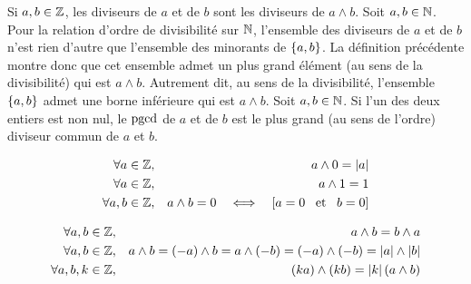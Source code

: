 \documentclass{magnolia}
\begin{document}
\begin{remarques}
\remarque Si $a,b\in\mathbb{Z}$, les diviseurs de $a$ et de $b$ sont les diviseurs
  de $a\wedge b$.
\remarque Soit $a,b\in\mathbb{N}$. Pour la relation d'ordre de divisibilité sur $\mathbb{N}$, l'ensemble
  des diviseurs de $a$ et de $b$ n'est rien d'autre que
  l'ensemble des minorants de $\left\{a,b\right\}$. La définition précédente montre donc que
  cet ensemble admet un plus grand élément (au sens de la divisibilité) qui est
  $a\wedge b$. Autrement dit, au sens de la divisibilité, l'ensemble $\left\{a,b\right\}$ admet
  une borne inférieure qui est $a\wedge b$.
\remarque Soit $a,b\in\mathbb{N}$. Si l'un des deux entiers est non nul,
  le $\operatorname{pgcd}$ de $a$ et de $b$ est le plus grand (au sens de l'ordre)
  diviseur commun de $a$ et $b$.
\end{remarques}

\begin{proposition}
\begin{eqnarray*}
\forall a\in\mathbb{Z}, & & a\wedge 0=\left|a\right|\\
\forall a\in\mathbb{Z}, & & a\wedge 1=1\\
\forall a,b\in\mathbb{Z}, & & a\wedge b=0 \quad\Longleftrightarrow\quad\left[a=0 \quad\!\text{et}\quad\! b=0\right]
\end{eqnarray*}
\end{proposition}

\begin{proposition}
\begin{eqnarray*}
\forall a,b\in\mathbb{Z}, & & a\wedge b=b\wedge a\\
\forall a,b\in\mathbb{Z}, & & a\wedge b=\left(-a\right)\wedge b=a\wedge\left(-b\right)=
  \left(-a\right)\wedge\left(-b\right)=\left|a\right|\wedge\left|b\right|\\
\forall a,b,k\in\mathbb{Z}, & & \left(ka\right)\wedge\left(kb\right)=\left|k\right|\left(a\wedge b\right)
\end{eqnarray*}
\end{proposition}
\end{document}
